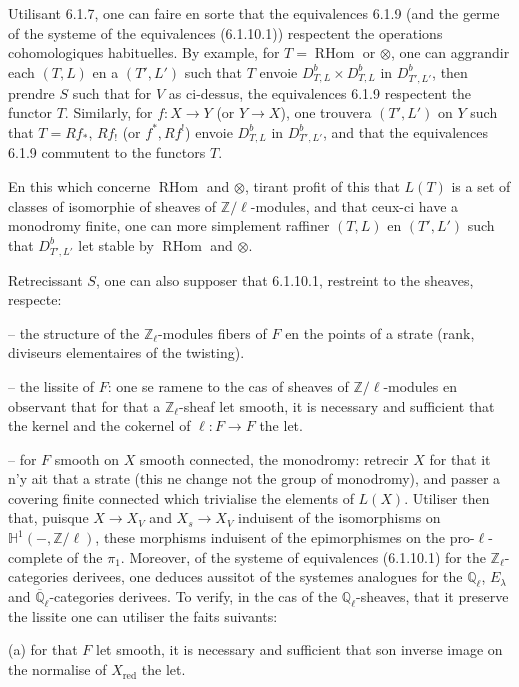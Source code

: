 \documentclass[12pt,a4paper]{article}
\theoremstyle{plain}
\theoremstyle{definition}
\theoremstyle{remark}
\DeclareMathOperator{\RHom}{RHom}
\newcommand{\HH}{\mathbb{H}}
\newcommand{\QQ}{\mathbb{Q}}
\newcommand{\ZZ}{\mathbb{Z}}
\begin{document}
Utilisant 6.1.7, one can faire en sorte that the equivalences 6.1.9 (and the germe of the systeme of the equivalences (6.1.10.1)) respectent the operations cohomologiques habituelles. By example, for $T = \RHom$ or $\otimes$, one can aggrandir each $(T, L)$ en a $(T', L')$ such that $T$ envoie $D^b_{T, L} \times D^b_{T, L}$ in $D^b_{T', L'}$, then prendre $S$ such that for $V$ as ci-dessus, the equivalences 6.1.9 respectent the functor $T$. Similarly, for $f: X \to Y$ (or $Y \to X$), one trouvera $(T', L')$ on $Y$ such that $T = Rf_*$, $Rf_!$ (or $f^*, Rf^!$) envoie $D^b_{T, L}$ in $D^b_{T', L'}$, and that the equivalences 6.1.9 commutent to the functors $T$.

En this which concerne $\RHom$ and $\otimes$, tirant profit of this that $L(T)$ is a set of classes of isomorphie of sheaves of $\ZZ/\ell$-modules, and that ceux-ci have a monodromy finite, one can more simplement raffiner $(T, L)$ en $(T', L')$ such that $D^b_{T', L'}$ let stable by $\RHom$ and $\otimes$.

Retrecissant $S$, one can also supposer that 6.1.10.1, restreint to the sheaves, respecte:

-- the structure of the $\ZZ_{\ell}$-modules fibers of $F$ en the points of a strate (rank, diviseurs elementaires of the twisting).

-- the lissite of $F$: one se ramene to the cas of sheaves of $\ZZ/\ell$-modules en observant that for that a $\ZZ_{\ell}$-sheaf let smooth, it is necessary and sufficient that the kernel and the cokernel of $\ell: F \to F$ the let.

-- for $F$ smooth on $X$ smooth connected, the monodromy: retrecir $X$ for that it n'y ait that a strate (this ne change not the group of monodromy), and passer a covering finite connected which trivialise the elements of $L(X)$. Utiliser then that, puisque $X \to X_V$ and $X_s \to X_V$ induisent of the isomorphisms on $\HH^1(-, \ZZ/\ell)$, these morphisms induisent of the epimorphismes on the pro-$\ell$-complete of the $\pi_1$. Moreover, of the systeme of equivalences (6.1.10.1) for the $\ZZ_{\ell}$-categories derivees, one deduces aussitot of the systemes analogues for the $\QQ_{\ell}$, $E_{\lambda}$ and $\overline{\QQ}_{\ell}$-categories derivees. To verify, in the cas of the $\QQ_{\ell}$-sheaves, that it preserve the lissite one can utiliser the faits suivants:

(a) for that $F$ let smooth, it is necessary and sufficient that son inverse image on the normalise of $X_{\text{red}}$ the let.
\end{document}

